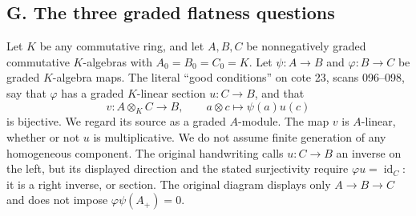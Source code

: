 \subsection{G. The three graded flatness questions}

Let $K$ be any commutative ring, and let $A,B,C$ be nonnegatively graded
commutative $K$-algebras with $A_0=B_0=C_0=K$.  Let
$\psi:A\to B$ and $\varphi:B\to C$ be graded $K$-algebra maps.
The literal ``good conditions'' on cote 23, scans 096--098, say that
$\varphi$ has a graded $K$-linear section $u:C\to B$, and that
\[
 v:A\otimes_K C\longrightarrow B,\qquad
 a\otimes c\longmapsto\psi(a)u(c)
\]
is bijective.  We regard its source as a graded $A$-module.  The map $v$
is $A$-linear, whether or not $u$ is multiplicative.  We do not assume
finite generation of any homogeneous component.
The original handwriting calls $u:C\to B$ an inverse on the
left, but its displayed direction and the stated surjectivity
require $\varphi u=\operatorname{id}_C$: it is a right inverse,
or section.  The original diagram displays only $A\to B\to C$
and does not impose $\varphi\psi(A_+)=0$.
\cite[physical PDF pp.~96--98, archive footer pp.~95--97]{algManuscript23}

